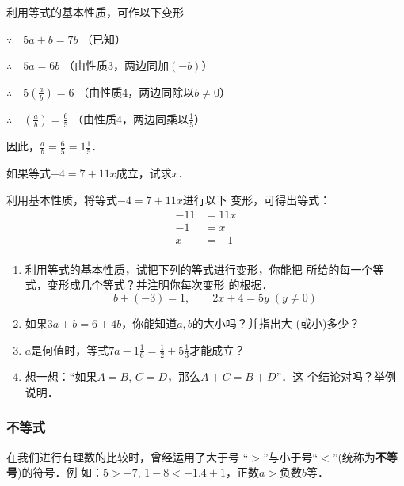 \begin{solution}
	利用等式的基本性质，可作以下变形
	
	$\because\quad 5a+b=7b$ （已知）
	
	$\therefore\quad 5a=6b$ （由性质3，两边同加$(-b)$）
	
	$\therefore\quad 5\left(\frac{a}{b}\right)=6$ （由性质4，两边同除以$b\ne 0$）
	
	$\therefore\quad \left(\frac{a}{b}\right)=\frac{6}{5}$ （由性质4，两边同乘以$\frac{1}{5}$）
	
	因此，$\frac{a}{b}=\frac{6}{5}=1\frac{1}{5}$．
\end{solution}

\begin{example}
	如果等式$-4=7+11x$成立，试求$x$．
\end{example}

\begin{solution}
	利用基本性质，将等式$-4=7+11x$进行以下
	变形，可得出等式：
	\begin{align*}
	-11&=11x  \tag{两边同减去7}\\
	-1&=x  \tag{两边同除以11}\\
	x&=-1  \tag{两边对调位置}\\
	\end{align*}
\end{solution}

\begin{ex}
	\begin{enumerate}
		\item 利用等式的基本性质，试把下列的等式进行变形，你能把
		所给的每一个等式，变形成几个等式？并注明你每次变形
		的根据．
		\[b+(-3)=1,\qquad 2x+4=5y\; (y\ne 0) \]
		\item 如果$3a+b=6+4b$，你能知道$a,b$的大小吗？并指出大
		(或小)多少？
		\item $a$是何值时，等式$7a-1\frac{1}{6}=\frac{1}{2}+5\frac{1}{3}$才能成立？
		
		\item 想一想：“如果$A=B$, $C=D$，那么$A+C=B+D$”．这
		个结论对吗？举例说明．
	\end{enumerate}   
\end{ex}

\subsubsection{不等式}
在我们进行有理数的比较时，曾经运用了大于号
“$>$”与小于号“$<$”(统称为\textbf{不等号})的符号．例
如：$5>-7$,  $1-8<-1.4+1$，正数$a>$负数$b$等．

